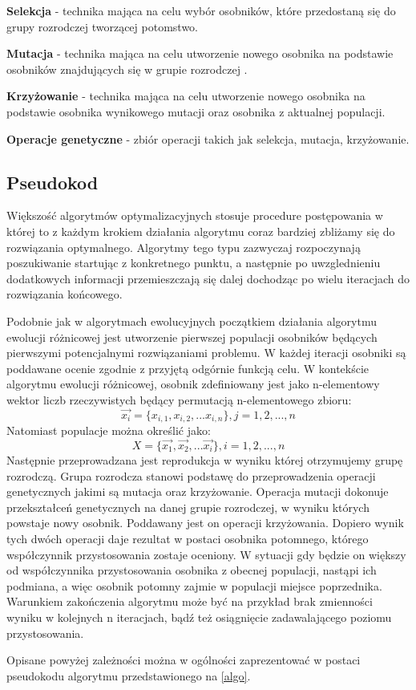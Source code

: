 \textbf{Selekcja} - technika mająca na celu wybór osobników, które przedostaną się do grupy rozrodczej tworzącej potomstwo.

\textbf{Mutacja} - technika mająca na celu utworzenie nowego osobnika na podstawie osobników znajdujących się w grupie rozrodczej .

\textbf{Krzyżowanie} - technika mająca na celu utworzenie nowego osobnika na podstawie osobnika wynikowego mutacji oraz osobnika z aktualnej populacji.

\textbf{Operacje genetyczne} - zbiór operacji takich jak selekcja, mutacja, krzyżowanie.

\subsection{Pseudokod}
\par
 Większość algorytmów optymalizacyjnych stosuje procedure postępowania w której to z każdym krokiem działania algorytmu coraz bardziej zbliżamy się do rozwiązania optymalnego. Algorytmy tego typu zazwyczaj rozpoczynają poszukiwanie startując z konkretnego punktu, a następnie po uwzglednieniu dodatkowych informacji przemieszczają się dalej dochodząc po wielu iteracjach do rozwiązania końcowego.\\
\par
 Podobnie jak w algorytmach ewolucyjnych początkiem działania algorytmu ewolucji różnicowej jest utworzenie pierwszej populacji osobników będących pierwszymi potencjalnymi rozwiązaniami problemu. W każdej iteracji osobniki są poddawane ocenie zgodnie z przyjętą odgórnie funkcją celu. W kontekście algorytmu ewolucji różnicowej, osobnik zdefiniowany jest jako n-elementowy wektor liczb rzeczywistych będący permutacją n-elementowego zbioru:\\
$$
 \overrightarrow{x_{i}}=\{x_{i,1},x_{i,2},...x_{i,n}\}, j = 1,2,...,n
$$
Natomiast populacje można określić jako:\\
$$
X=\{\overrightarrow{x_{1}},\overrightarrow{x_{2}},...\overrightarrow{x_{i}}\}, i = 1,2,...,n
$$
Następnie przeprowadzana jest reprodukcja w wyniku której otrzymujemy grupę rozrodczą. Grupa rozrodcza stanowi podstawę do przeprowadzenia operacji genetycznych jakimi są mutacja oraz krzyżowanie. Operacja mutacji dokonuje przekształceń genetycznych na danej grupie rozrodczej, w wyniku których powstaje nowy osobnik. Poddawany jest on operacji krzyżowania. Dopiero wynik tych dwóch operacji daje rezultat w postaci osobnika potomnego, którego współczynnik przystosowania zostaje oceniony. W sytuacji gdy będzie on większy od współczynnika przystosowania osobnika z obecnej populacji, nastąpi ich podmiana, a więc osobnik potomny zajmie w populacji miejsce poprzednika. Warunkiem zakończenia algorytmu może być na przykład brak zmienności wyniku w kolejnych n iteracjach, bądź też osiągnięcie zadawalającego poziomu przystosowania.\\
\par
Opisane powyżej zależności można w ogólności zaprezentować w postaci pseudokodu algorytmu przedstawionego na \ref{algo}.

